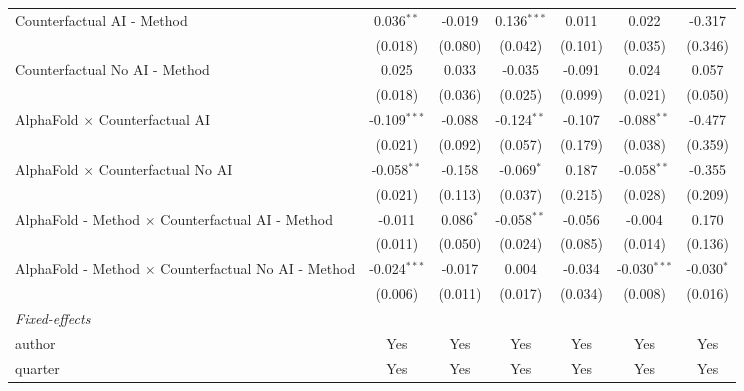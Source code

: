 \begin{tabular}{lcccccc}
   Counterfactual AI - Method                                 & 0.036$^{**}$   & -0.019       & 0.136$^{***}$ & 0.011   & 0.022          & -0.317\\   
                                                              & (0.018)        & (0.080)      & (0.042)       & (0.101) & (0.035)        & (0.346)\\   
   Counterfactual No AI - Method                              & 0.025          & 0.033        & -0.035        & -0.091  & 0.024          & 0.057\\   
                                                              & (0.018)        & (0.036)      & (0.025)       & (0.099) & (0.021)        & (0.050)\\   
   AlphaFold $\times$ Counterfactual AI                       & -0.109$^{***}$ & -0.088       & -0.124$^{**}$ & -0.107  & -0.088$^{**}$  & -0.477\\   
                                                              & (0.021)        & (0.092)      & (0.057)       & (0.179) & (0.038)        & (0.359)\\   
   AlphaFold $\times$ Counterfactual No AI                    & -0.058$^{**}$  & -0.158       & -0.069$^{*}$  & 0.187   & -0.058$^{**}$  & -0.355\\   
                                                              & (0.021)        & (0.113)      & (0.037)       & (0.215) & (0.028)        & (0.209)\\   
   AlphaFold - Method $\times$ Counterfactual AI - Method     & -0.011         & 0.086$^{*}$  & -0.058$^{**}$ & -0.056  & -0.004         & 0.170\\   
                                                              & (0.011)        & (0.050)      & (0.024)       & (0.085) & (0.014)        & (0.136)\\   
   AlphaFold - Method $\times$ Counterfactual No AI - Method  & -0.024$^{***}$ & -0.017       & 0.004         & -0.034  & -0.030$^{***}$ & -0.030$^{*}$\\   
                                                              & (0.006)        & (0.011)      & (0.017)       & (0.034) & (0.008)        & (0.016)\\   
   \midrule
   \emph{Fixed-effects}\\
   author                                                     & Yes            & Yes          & Yes           & Yes     & Yes            & Yes\\  
   quarter                                                    & Yes            & Yes          & Yes           & Yes     & Yes            & Yes\\  

\end{tabular}

